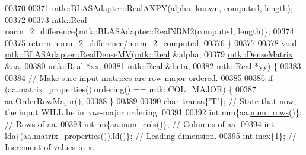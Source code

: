 \begin{DoxyCode}
00370 
00371   \hyperlink{classmtk_1_1BLASAdapter_a081cd092ae65e730f44eae8643edd539}{mtk::BLASAdapter::RealAXPY}(alpha, known, computed, length);
00372 
00373   \hyperlink{group__c01-roots_gac080bbbf5cbb5502c9f00405f894857d}{mtk::Real} norm\_2\_difference\{\hyperlink{classmtk_1_1BLASAdapter_ab92440888b730863244c5d9479c11aca}{mtk::BLASAdapter::RealNRM2}(computed, 
      length)\};
00374 
00375   \textcolor{keywordflow}{return} norm\_2\_difference/norm\_2\_computed;
00376 \}
00377 
\hypertarget{mtk__blas__adapter_8cc_source_l00378}{}\hyperlink{classmtk_1_1BLASAdapter_afdcac059a4294287cb55638221220646}{00378} \textcolor{keywordtype}{void} \hyperlink{classmtk_1_1BLASAdapter_afdcac059a4294287cb55638221220646}{mtk::BLASAdapter::RealDenseMV}(\hyperlink{group__c01-roots_gac080bbbf5cbb5502c9f00405f894857d}{mtk::Real} &alpha,
00379                                    \hyperlink{classmtk_1_1DenseMatrix}{mtk::DenseMatrix} &aa,
00380                                    \hyperlink{group__c01-roots_gac080bbbf5cbb5502c9f00405f894857d}{mtk::Real} *xx,
00381                                    \hyperlink{group__c01-roots_gac080bbbf5cbb5502c9f00405f894857d}{mtk::Real} &beta,
00382                                    \hyperlink{group__c01-roots_gac080bbbf5cbb5502c9f00405f894857d}{mtk::Real} *yy) \{
00383 
00384   \textcolor{comment}{// Make sure input matrices are row-major ordered.}
00385 
00386   \textcolor{keywordflow}{if} (aa.\hyperlink{classmtk_1_1DenseMatrix_a5aa83a0643f27a4652ea97630edf7143}{matrix\_properties}().\hyperlink{classmtk_1_1Matrix_a13cd17621652cd5551ff98549bd94df7}{ordering}() == 
      \hyperlink{namespacemtk_ga622801bd9f912d0f976c3e383f5f581ca7c11989c132253fb76b8f6b1314f7e13}{mtk::COL\_MAJOR}) \{
00387     aa.\hyperlink{classmtk_1_1DenseMatrix_ac2949efba3e8278335d45418c85433e4}{OrderRowMajor}();
00388   \}
00389 
00390   \textcolor{keywordtype}{char} transa\{\textcolor{charliteral}{'T'}\}; \textcolor{comment}{// State that now, the input WILL be in row-major ordering.}
00391 
00392   \textcolor{keywordtype}{int} mm\{aa.\hyperlink{classmtk_1_1DenseMatrix_a53f3afb3b6a8d21854458aaa9663cc74}{num\_rows}()\};                  \textcolor{comment}{// Rows of aa.}
00393   \textcolor{keywordtype}{int} nn\{aa.\hyperlink{classmtk_1_1DenseMatrix_a41747502d468c6728a4be31501b16e0e}{num\_cols}()\};                  \textcolor{comment}{// Columns of aa.}
00394   \textcolor{keywordtype}{int} lda\{(aa.\hyperlink{classmtk_1_1DenseMatrix_a5aa83a0643f27a4652ea97630edf7143}{matrix\_properties}()).ld()\}; \textcolor{comment}{// Leading dimension.}
00395   \textcolor{keywordtype}{int} incx\{1\};                            \textcolor{comment}{// Increment of values in x.}

\end{DoxyCode}

